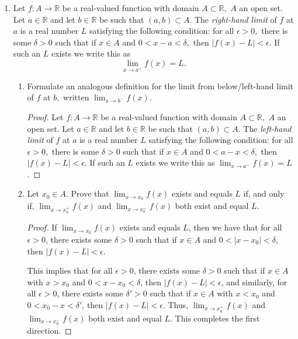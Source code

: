 \documentclass[11pt]{article}
\newcommand{\bbR}{\mathbb{R}}
\renewcommand{\_}[1]{\underline{ #1 }}
\theoremstyle{definition}
\numberwithin{equation}{subsection}
\begin{document}
\begin{enumerate}
\item
Let $f:A\longrightarrow \bbR$ be a real-valued function with domain $A\subset \bbR,$ $A$ an open set. Let $a\in\bbR$ and let 
$b\in\bbR$ be such that $(a,b)\subset A.$ The {\it right-hand limit} of $f$ at $a$ is a real number $L$ satisfying the following condition: for all $ \epsilon>0,$ there is some $\delta>0$ such that if $x\in A$ and $0<x-a<\delta,$ then $|f(x)-L|<\epsilon.$
If such an $L$ exists we write this as 
$$\lim_{x\longrightarrow a^+} f(x)=L.$$
\begin{enumerate}
\item[a)] Formulate an analogous definition for the limit from below/left-hand limit of $f$ at $b,$ written $\displaystyle \lim_{x\longrightarrow b^-} f(x).$ 

\begin{proof}
Let $f:A\longrightarrow \bbR$ be a real-valued function with domain $A\subset \bbR,$ $A$ an open set. Let $a\in\bbR$ and let 
$b\in\bbR$ be such that $(a,b)\subset A.$ The {\it left-hand limit} of $f$ at $a$ is a real number $L$ satisfying the following condition: for all $ \epsilon>0,$ there is some $\delta>0$ such that if $x\in A$ and $0<a-x<\delta,$ then $|f(x)-L|<\epsilon.$
If such an $L$ exists we write this as 
$\lim_{x\rightarrow a^-} f(x)=L$.



\renewcommand\qedsymbol{QED}
\end{proof}


\item[b)] Let $x_0\in A.$ Prove that $\displaystyle \lim_{x\longrightarrow x_0} f(x)$ exists and equals $L$ if, and only if, $\displaystyle \lim_{x\longrightarrow x_0^+} f(x)$ and
$\displaystyle \lim_{x\longrightarrow x_0^-}f(x)$ both exist and equal $L.$

\begin{proof}
If \( \lim_{x\rightarrow x_0} f(x) \) exists and equals \( L \), then we have that for all \( \epsilon>0 \), there exists some \(\delta>0\) such that if \(x\in A\) and \(0<|x-x_0|<\delta\), then \(|f(x)-L|<\epsilon\). 

This implies that for all \( \epsilon>0 \), there exists some \(\delta>0\) such that if \(x\in A\) with $x>x_0$ and \(0<x-x_0<\delta\), then \(|f(x)-L|<\epsilon\), and similarly, for all \( \epsilon>0 \), there exists some \(\delta'>0\) such that if \(x\in A\) with $x<x_0$ and \(0<x_0-x<\delta'\), then \(|f(x)-L|<\epsilon\). Thus, \(\lim_{x\rightarrow x_0^+}f(x)\) and \(\lim_{x\rightarrow x_0^-}f(x)\) both exist and equal \(L\). This completes the first direction.


\end{proof}
\end{enumerate}
\end{enumerate}
\end{document}
